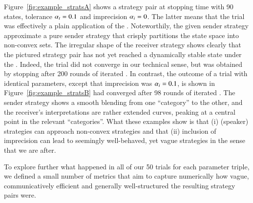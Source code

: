 Figure~\ref{fig:example_stratsA} shows a strategy pair at stopping
time with 90 states, tolerance $\alpha_t = 0.1$ and imprecision
$\alpha_i = 0$. The latter means that the trial was effectively a
plain application of the \rd. Noteworthily, the given sender strategy
approximate a pure sender strategy that crisply partitions the state
space into non-convex sets. The irregular shape of the receiver
strategy shows clearly that the pictured strategy pair has not yet
reached a dynamically stable state under the \rd. Indeed, the trial
did not converge in our technical sense, but was obtained by stopping
after 200 rounds of iterated \rdd. In contrast, the outcome of a trial
with identical parameters, except that imprecision was $\alpha_i =
0.1$, is shown in Figure~\ref{fig:example_stratsB} had converged after
98 rounds of iterated \rdd. The sender strategy shows a smooth
blending from one ``category'' to the other, and the receiver's
interpretations are rather extended curves, peaking at a central point
in the relevant ``categories''. What these examples show is that (i)
(speaker) strategies can approach non-convex strategies and that (ii)
inclusion of imprecision can lead to seemingly well-behaved, yet vague
strategies in the sense that we are after.

To explore further what happened in all of our 50 trials for each
parameter triple, we defined a small number of metrics that aim to
capture numerically how vague, communicatively efficient and generally
well-structured the resulting strategy pairs were.



